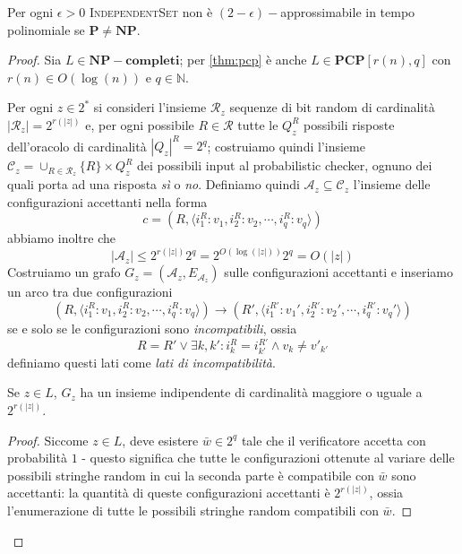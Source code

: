 \begin{theorem}\label{thm:ind_set_inapprox}
	Per ogni $\epsilon > 0$ \textsc{IndependentSet} non è $(2-\epsilon)-$approssimabile
	in tempo polinomiale se $\mathbf{P} \neq \mathbf{NP}$.
\end{theorem}
\begin{proof}
	Sia $L \in \mathbf{NP-completi}$; per \cref{thm:pcp} è anche $L \in \mathbf{PCP}[r(n), q]$
	con $r(n) \in O(\log(n))$ e $q \in \mathbb{N}$.

	Per ogni $z \in 2^*$ si consideri l'insieme $\mathcal{R}_z$ sequenze
	di bit random di cardinalità $|\mathcal{R}_z| = 2 ^ {r(|z|)}$
	e, per ogni possibile $R \in \mathcal{R}$
	tutte le $Q_z^R$ possibili risposte dell'oracolo di cardinalità
	$|Q_z|^R = 2^q$; costruiamo quindi
	l'insieme $\mathcal{C}_z = \cup_{R \in \mathcal{R}_z} \{R\} \times Q_z^R$
	dei possibili input al probabilistic checker,
	ognuno dei quali porta ad una risposta \textit{sì} o \textit{no}.
	Definiamo quindi  $\mathcal{A}_z \subseteq \mathcal{C}_z$
	l'insieme delle configurazioni accettanti nella forma
	$$
		c = (R, \langle i_1^R: v_1, i_2^R: v_2, \cdots, i_q^R:v_q \rangle)
	$$
	abbiamo inoltre che
	$$
		|\mathcal{A}_z| \leq 2^{r(|z|)}2^q = 2^{O(\log(|z|))}2^q = O(|z|)
	$$
	Costruiamo un grafo $G_z = (\mathcal{A}_z, E_{\mathcal{A}_z})$ sulle configurazioni accettanti e
	inseriamo un arco tra due configurazioni
	$$
		(R, \langle i_1^R: v_1, i_2^R: v_2, \cdots, i_q^R:v_q\rangle) \rightarrow (R', \langle i_1^{R'}: v_1', i_2^{R'}: v_2', \cdots, i_q^{R'}:v_q'\rangle)
	$$
	se e solo se le configurazioni sono \textit{incompatibili}, ossia 
	$$
	R = R' \lor \exists k, k': i^R_k = i^{R'}_{k'} \land v_k \neq v'_{k'}
	$$
	definiamo questi lati come \textit{lati di incompatibilità}.
\begin{oss} \label{lem:ind_set_zinl}
	Se $z \in L$, $G_z$ ha un insieme indipendente di cardinalità maggiore o
	uguale a $2^{r(|z|)}$.
\end{oss}
\begin{proof}
	Siccome $z \in L$, deve esistere $\bar{w} \in 2^q$ tale che il verificatore
	accetta con probabilità $1$ - questo significa che tutte le
	configurazioni ottenute al variare delle possibili stringhe random in cui
	la seconda parte è compatibile con $\bar{w}$ sono accettanti: la quantità
	di queste configurazioni accettanti è $2^{r(|z|)}$, ossia l'enumerazione di
	tutte le possibili stringhe random compatibili con $\bar{w}$.
\end{proof}
\begin{oss}\label{lem:ind_set_znotinl}

\end{oss}
\end{proof}
